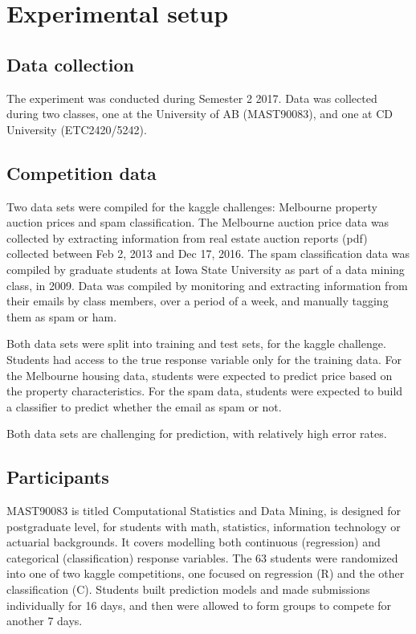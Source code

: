 \documentclass[12pt]{article}
\begin{document}
\section{Experimental setup}\label{experimental-setup}

\subsection{Data collection}\label{data-collection}

The experiment was conducted during Semester 2 2017. Data was collected
during two classes, one at the University of AB (MAST90083), and one at
CD University (ETC2420/5242).

\subsection{Competition data}\label{competition-data}

Two data sets were compiled for the kaggle challenges: Melbourne
property auction prices and spam classification. The Melbourne auction
price data was collected by extracting information from real estate
auction reports (pdf) collected between Feb 2, 2013 and Dec 17, 2016.
The spam classification data was compiled by graduate students at Iowa
State University as part of a data mining class, in 2009. Data was
compiled by monitoring and extracting information from their emails by
class members, over a period of a week, and manually tagging them as
spam or ham.

Both data sets were split into training and test sets, for the kaggle
challenge. Students had access to the true response variable only for
the training data. For the Melbourne housing data, students were
expected to predict price based on the property characteristics. For the
spam data, students were expected to build a classifier to predict
whether the email as spam or not.

Both data sets are challenging for prediction, with relatively high
error rates.

\subsection{Participants}\label{participants}

MAST90083 is titled Computational Statistics and Data Mining, is
designed for postgraduate level, for students with math, statistics,
information technology or actuarial backgrounds. It covers modelling
both continuous (regression) and categorical (classification) response
variables. The 63 students were randomized into one of two kaggle
competitions, one focused on regression (R) and the other classification
(C). Students built prediction models and made submissions individually
for 16 days, and then were allowed to form groups to compete for another
7 days.
\end{document}
